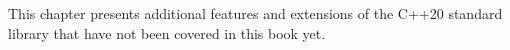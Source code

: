 This chapter presents additional features and extensions of the C++20 standard library that have not been covered in this book yet.